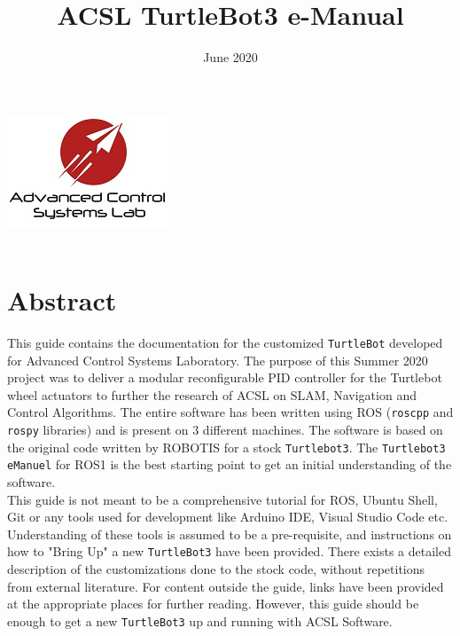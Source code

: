 \documentclass[12]{article}
\title{ACSL TurtleBot3 e-Manual}
\date{June 2020}
\begin{document}
\makeatletter
    \begin{titlepage}
        \begin{center}
            \includegraphics[width=0.7\linewidth]{images/ACSL_Logo.jpg}\\[4ex]
            {\huge \bfseries  \@title }\\[52ex]  
            {\large \@date}
        \end{center}
    \end{titlepage}
\makeatother

\tableofcontents
\newpage
\section*{Abstract}
This guide contains the documentation for the customized \texttt{TurtleBot} developed for Advanced Control Systems Laboratory. The purpose of this Summer 2020 project was to deliver a modular reconfigurable PID controller for the Turtlebot wheel actuators to further the research of ACSL on SLAM, Navigation and Control Algorithms. The entire software has been written using ROS (\texttt{roscpp} and \texttt{rospy} libraries) and is present on 3 different machines. The software is based on the original code written by ROBOTIS for a stock \texttt{Turtlebot3}. The \texttt{Turtlebot3 eManuel} for ROS1 is the best starting point to get an initial understanding of the software.\\
This guide is not meant to be a comprehensive tutorial for ROS, Ubuntu Shell, Git or any tools used for development like Arduino IDE, Visual Studio Code etc. Understanding of these tools is assumed to be a pre-requisite, and instructions on how to "Bring Up" a new \texttt{TurtleBot3} have been provided. There exists a detailed description of the customizations done to the stock code, without repetitions from external literature. For content outside the guide, links have been provided at the appropriate places for further reading. However, this guide should be enough to get a new \texttt{TurtleBot3} up and running with ACSL Software.
\newpage
\end{document}
